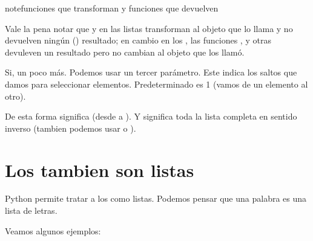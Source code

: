 \documentclass[a5paper,9pt,spanish]{sphinxmanual}
\begin{document}
\begin{sphinxadmonition}{note}{funciones que transforman y funciones que devuelven}

\sphinxAtStartPar
Vale la pena notar que  y  en las listas transforman al objeto que lo llama
y no devuelven ningún () resultado; en cambio en los , las funciones ,
 y otras devuleven un resultado pero no cambian al objeto que los llamó.
\end{sphinxadmonition}

\sphinxAtStartPar
{}
Si, un poco más. Podemos usar un tercer parámetro. Este indica los saltos que
damos para seleccionar elementos. Predeterminado es 1 (vamos de un elemento al otro).

\sphinxAtStartPar
De esta forma  significa  (desde  a ).
Y  significa toda la lista completa
en sentido inverso (tambien podemos usar  o ).


\section{Los  tambien son listas}
\label{\detokenize{list:los-strings-tambien-son-listas}}
\sphinxAtStartPar
Python permite tratar a los  como listas.
Podemos pensar que una palabra es una lista de letras.

\sphinxAtStartPar
Veamos algunos ejemplos:

\begin{sphinxVerbatim}[commandchars=\\\{\}]
  
\PYG{p}{[}\PYG{p}{]}
\PYG{p}{[}\PYG{p}{]}
\end{sphinxVerbatim}
\end{document}
